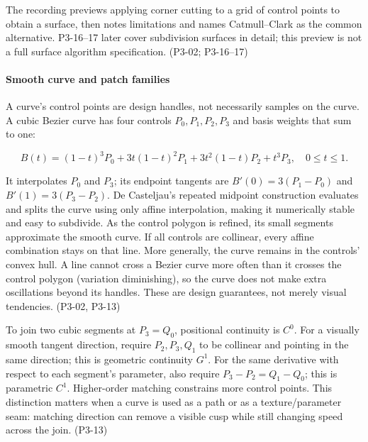 The recording previews applying corner cutting to a grid of control points to obtain a surface, then notes limitations and names Catmull--Clark as the common alternative. P3-16--17 later cover subdivision surfaces in detail; this preview is not a full surface algorithm specification. (P3-02; P3-16--17)

\paragraph{Smooth curve and patch families}\label{smooth-curve-and-patch-families}

A curve's control points are design handles, not necessarily samples on the curve. A cubic Bezier curve has four controls \(P_0,P_1,P_2,P_3\) and basis weights that sum to one:

\[
B(t)=(1-t)^3P_0+3t(1-t)^2P_1+3t^2(1-t)P_2+t^3P_3,\quad 0\le t\le1.
\]

It interpolates \(P_0\) and \(P_3\); its endpoint tangents are \(B'(0)=3(P_1-P_0)\) and \(B'(1)=3(P_3-P_2)\). De Casteljau's repeated midpoint construction evaluates and splits the curve using only affine interpolation, making it numerically stable and easy to subdivide. As the control polygon is refined, its small segments approximate the smooth curve. If all controls are collinear, every affine combination stays on that line. More generally, the curve remains in the controls' convex hull. A line cannot cross a Bezier curve more often than it crosses the control polygon (variation diminishing), so the curve does not make extra oscillations beyond its handles. These are design guarantees, not merely visual tendencies. (P3-02, P3-13)

To join two cubic segments at \(P_3=Q_0\), positional continuity is \(C^0\). For a visually smooth tangent direction, require \(P_2,P_3,Q_1\) to be collinear and pointing in the same direction; this is geometric continuity \(G^1\). For the same derivative with respect to each segment's parameter, also require \(P_3-P_2=Q_1-Q_0\); this is parametric \(C^1\). Higher-order matching constrains more control points. This distinction matters when a curve is used as a path or as a texture/parameter seam: matching direction can remove a visible cusp while still changing speed across the join. (P3-13)

